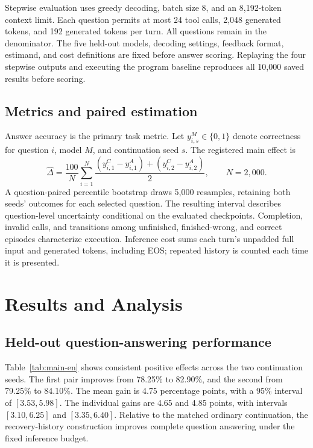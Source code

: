 Stepwise evaluation uses greedy decoding, batch size 8, and an 8,192-token context limit. Each question permits at most 24 tool calls, 2,048 generated tokens, and 192 generated tokens per turn. All questions remain in the denominator. The five held-out models, decoding settings, feedback format, estimand, and cost definitions are fixed before answer scoring. Replaying the four stepwise outputs and executing the program baseline reproduces all 10,000 saved results before scoring.

\subsection{Metrics and paired estimation}

Answer accuracy is the primary task metric. Let $y_{i,s}^M\in\{0,1\}$ denote correctness for question $i$, model $M$, and continuation seed $s$. The registered main effect is
\begin{equation}
 \widehat\Delta=\frac{100}{N}\sum_{i=1}^{N}
 \frac{(y_{i,1}^{C}-y_{i,1}^{A})+(y_{i,2}^{C}-y_{i,2}^{A})}{2},
 \qquad N=2{,}000.
\end{equation}
A question-paired percentile bootstrap draws 5,000 resamples, retaining both seeds' outcomes for each selected question. The resulting interval describes question-level uncertainty conditional on the evaluated checkpoints. Completion, invalid calls, and transitions among unfinished, finished-wrong, and correct episodes characterize execution. Inference cost sums each turn's unpadded full input and generated tokens, including EOS; repeated history is counted each time it is presented.

\section{Results and Analysis}

\subsection{Held-out question-answering performance}

\begin{table}[htbp]
 \centering\small
 \caption{Results on the same 2,000 project-held-out questions. Differences and confidence intervals are in percentage points.}
 \label{tab:main-en}
 \RecoveryMainTableEN
\end{table}

Table~\ref{tab:main-en} shows consistent positive effects across the two continuation seeds. The first pair improves from 78.25\% to 82.90\%, and the second from 79.25\% to 84.10\%. The mean gain is 4.75 percentage points, with a 95\% interval of $[3.53,5.98]$. The individual gains are 4.65 and 4.85 points, with intervals $[3.10,6.25]$ and $[3.35,6.40]$. Relative to the matched ordinary continuation, the recovery-history construction improves complete question answering under the fixed inference budget.

